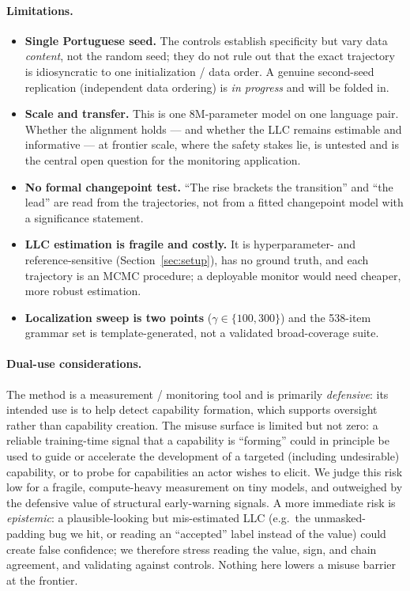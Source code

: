 \documentclass[11pt]{article}
\begin{document}
\paragraph{Limitations.}
\begin{itemize}\itemsep2pt
  \item \textbf{Single Portuguese seed.} The controls establish specificity but
  vary data \emph{content}, not the random seed; they do not rule out that the
  exact trajectory is idiosyncratic to one initialization / data order. A genuine
  second-seed replication (independent data ordering) is \emph{in progress} and
  will be folded in.
  \item \textbf{Scale and transfer.} This is one 8M-parameter model on one
  language pair. Whether the alignment holds --- and whether the LLC remains
  estimable and informative --- at frontier scale, where the safety stakes lie, is
  untested and is the central open question for the monitoring application.
  \item \textbf{No formal changepoint test.} ``The rise brackets the transition''
  and ``the lead'' are read from the trajectories, not from a fitted changepoint
  model with a significance statement.
  \item \textbf{LLC estimation is fragile and costly.} It is hyperparameter- and
  reference-sensitive (Section~\ref{sec:setup}), has no ground truth, and each
  trajectory is an MCMC procedure; a deployable monitor would need cheaper, more
  robust estimation.
  \item \textbf{Localization sweep is two points} ($\gamma\in\{100,300\}$) and the
  538-item grammar set is template-generated, not a validated broad-coverage suite.
\end{itemize}

\paragraph{Dual-use considerations.} The method is a measurement / monitoring tool
and is primarily \emph{defensive}: its intended use is to help detect capability
formation, which supports oversight rather than capability creation. The misuse
surface is limited but not zero: a reliable training-time signal that a capability
is ``forming'' could in principle be used to guide or accelerate the development of
a targeted (including undesirable) capability, or to probe for capabilities an
actor wishes to elicit. We judge this risk low for a fragile, compute-heavy
measurement on tiny models, and outweighed by the defensive value of structural
early-warning signals. A more immediate risk is \emph{epistemic}: a
plausible-looking but mis-estimated LLC (e.g.\ the unmasked-padding bug we hit, or
reading an ``accepted'' label instead of the value) could create false confidence;
we therefore stress reading the value, sign, and chain agreement, and validating
against controls. Nothing here lowers a misuse barrier at the frontier.
\end{document}
